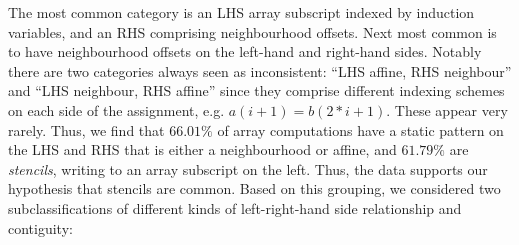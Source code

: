 \begin{center}
\begin{tabular}{ll|S[table-format=4]S[table-format=2.2]S[table-format=4]S[table-format=2.2]c}
\end{tabular}
\end{center}
%
The most common category is an LHS array subscript
indexed by induction variables, and an RHS comprising
neighbourhood offsets. Next most common is to have neighbourhood
offsets on the left-hand and right-hand sides. Notably
there are two categories always seen as inconsistent:
``LHS affine, RHS neighbour'' and ``LHS neighbour, RHS affine''
since they comprise different indexing schemes
on each side of the assignment, e.g. $a(i + 1) = b(2*i + 1)$. These
appear very rarely. Thus, we find that $66.01\%$ of array computations
have a static pattern on the LHS and RHS that is either
a neighbourhood or affine, and $61.79\%$ are \emph{stencils},
writing to an array subscript on the left. Thus, the data supports our
hypothesis that stencils are common. Based on this grouping, we
considered two subclassifications of different kinds of
left-right-hand side relationship and contiguity:
